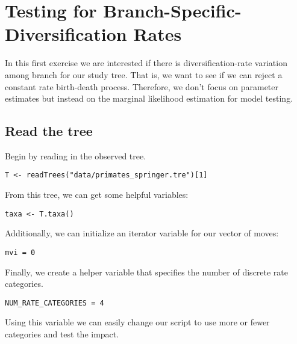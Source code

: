 \bigskip
\section{Testing for Branch-Specific-Diversification Rates}

In this first exercise we are interested if there is diversification-rate variation among branch for our study tree.
That is, we want to see if we can reject a constant rate birth-death process.
Therefore, we don't focus on parameter estimates but instead on the marginal likelihood estimation for model testing.



\subsection{Read the tree}

Begin by reading in the observed tree. 

{\tt \begin{snugshade*}
\begin{lstlisting}
T <- readTrees("data/primates_springer.tre")[1]
\end{lstlisting}
\end{snugshade*}}

From this tree, we can get some helpful variables:
{\tt \begin{snugshade*}
\begin{lstlisting}
taxa <- T.taxa()
\end{lstlisting}
\end{snugshade*}}

Additionally, we can initialize an iterator variable for our vector of moves:
{\tt \begin{snugshade*}
\begin{lstlisting}
mvi = 0
\end{lstlisting}
\end{snugshade*}}

Finally, we create a helper variable that specifies the number of discrete rate categories.
{\tt \begin{snugshade*}
\begin{lstlisting}
NUM_RATE_CATEGORIES = 4
\end{lstlisting}
\end{snugshade*}}
Using this variable we can easily change our script to use more or fewer categories and test the impact.



